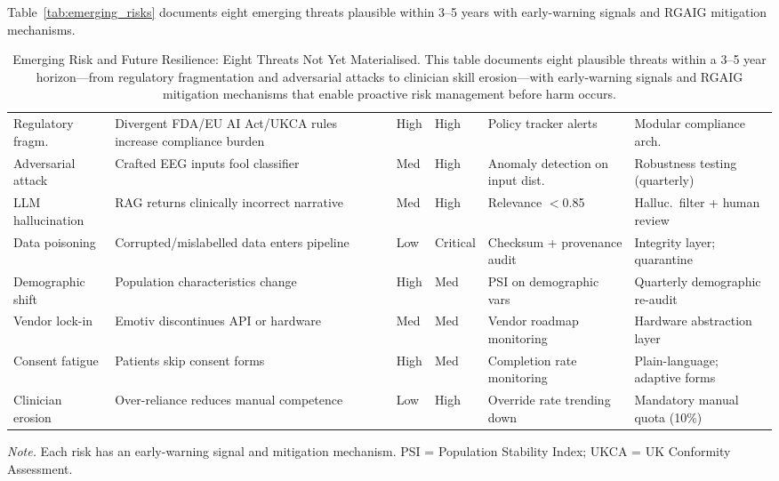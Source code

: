 Table~\ref{tab:emerging_risks} documents eight emerging threats plausible within 3--5 years with early-warning signals and RGAIG mitigation mechanisms.

\begin{table}[!htbp]
\tablestripes\tablefontsize
\caption[Emerging Risk and Future Resilience: Eight Threats Not]{Emerging Risk and Future Resilience: Eight Threats Not Yet Materialised. This table documents eight plausible threats within a 3--5 year horizon---from regulatory fragmentation and adversarial attacks to clinician skill erosion---with early-warning signals and RGAIG mitigation mechanisms that enable proactive risk management before harm occurs.}
\tablefontsize
\begin{tabularx}{\textwidth}{@{} >{\raggedright\arraybackslash}p{1.3cm} L >{\raggedright\arraybackslash}p{0.6cm} >{\raggedright\arraybackslash}p{0.6cm} L L @{}}
\toprule
{} &  &  &  &  &  \\
\midrule
Regulatory fragm. & Divergent FDA/EU AI Act/UKCA rules increase compliance burden & High & High & Policy tracker alerts & Modular compliance arch. \\
\addlinespace
Adversarial attack & Crafted EEG inputs fool classifier & Med & High & Anomaly detection on input dist. & Robustness testing (quarterly) \\
\addlinespace
LLM hallucination & RAG returns clinically incorrect narrative & Med & High & Relevance $<$0.85 & Halluc.\ filter + human review \\
\addlinespace
Data poisoning & Corrupted/mislabelled data enters pipeline & Low & Critical & Checksum + provenance audit & Integrity layer; quarantine \\
\addlinespace
Demographic shift & Population characteristics change & High & Med & PSI on demographic vars & Quarterly demographic re-audit \\
\addlinespace
Vendor lock-in & Emotiv discontinues API or hardware & Med & Med & Vendor roadmap monitoring & Hardware abstraction layer \\
\addlinespace
Consent fatigue & Patients skip consent forms & High & Med & Completion rate monitoring & Plain-language; adaptive forms \\
\addlinespace
Clinician erosion & Over-reliance reduces manual competence & Low & High & Override rate trending down & Mandatory manual quota (10\%) \\
\bottomrule
\end{tabularx}
\vspace{0.5em}\noindent\textit{Note.} Each risk has an early-warning signal and mitigation mechanism. PSI = Population Stability Index; UKCA = UK Conformity Assessment.
\end{table}

